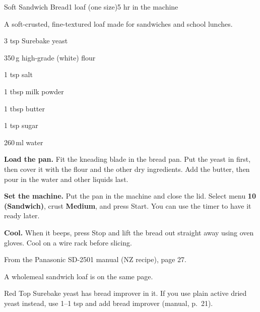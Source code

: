 \begin{recipebox}{Soft Sandwich Bread}{1 loaf (one size)}{5 hr in the machine}

A soft-crusted, fine-textured loaf made for sandwiches and school lunches.

\begin{ingredients}
  \item 3 tsp Surebake yeast
  \item 350\,g high-grade (white) flour
  \item 1 tsp salt
  \item 1 tbsp milk powder
  \item 1 tbsp butter
  \item 1 tsp sugar
  \item 260\,ml water
\end{ingredients}

\begin{method}
  \item \textbf{Load the pan.} Fit the kneading blade in the bread pan. Put the yeast in first, then cover it with the flour and the other dry ingredients. Add the butter, then pour in the water and other liquids last.
  \item \textbf{Set the machine.} Put the pan in the machine and close the lid. Select menu \textbf{10 (Sandwich)}, crust \textbf{Medium}, and press Start. You can use the timer to have it ready later.
  \item \textbf{Cool.} When it beeps, press Stop and lift the bread out straight away using oven gloves. Cool on a wire rack before slicing.
\end{method}

\begin{notelist}
  \item From the Panasonic SD-2501 manual (NZ recipe), page 27.
  \item A wholemeal sandwich loaf is on the same page.
  \item Red Top Surebake yeast has bread improver in it. If you use plain active dried yeast instead, use 1--1 tsp and add bread improver (manual, p.~21).
\end{notelist}

\end{recipebox}
